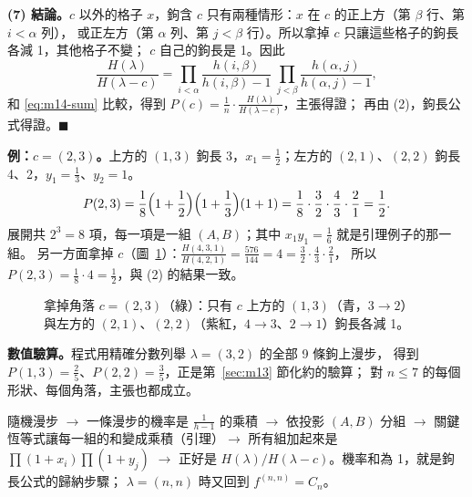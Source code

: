 \textbf{(7) 結論。}$c$ 以外的格子 $x$，鉤含 $c$ 只有兩種情形：$x$ 在 $c$ 的正上方（第 $\beta$ 行、第 $i<\alpha$ 列），
或正左方（第 $\alpha$ 列、第 $j<\beta$ 行）。所以拿掉 $c$ 只讓這些格子的鉤長各減 1，其他格子不變；
$c$ 自己的鉤長是 1。因此
\[
\frac{H(\lambda)}{H(\lambda-c)}=\prod_{i<\alpha}\frac{h(i,\beta)}{h(i,\beta)-1}\ \prod_{j<\beta}\frac{h(\alpha,j)}{h(\alpha,j)-1},
\]
和 \eqref{eq:m14-sum} 比較，得到 $P(c)=\frac1n\cdot\frac{H(\lambda)}{H(\lambda-c)}$，主張得證；
再由 (2)，鉤長公式得證。$\blacksquare$

\textbf{例：$c=(2,3)$。}上方的 $(1,3)$ 鉤長 3，$x_1=\frac12$；左方的 $(2,1)$、$(2,2)$ 鉤長 4、2，$y_1=\frac13$、$y_2=1$。
\[
P(2,3)=\frac18\Bigl(1+\frac12\Bigr)\Bigl(1+\frac13\Bigr)(1+1)=\frac18\cdot\frac32\cdot\frac43\cdot\frac21=\frac12 .
\]
展開共 $2^3=8$ 項，每一項是一組 $(A,B)$；其中 $x_1y_1=\frac16$ 就是引理例子的那一組。
另一方面拿掉 $c$（圖~\ref{fig:m14-remove}）：$\frac{H(4,3,1)}{H(4,2,1)}=\frac{576}{144}=4=\frac32\cdot\frac43\cdot\frac21$，
所以 $P(2,3)=\frac18\cdot4=\frac12$，與 (2) 的結果一致。

\begin{figure}[H]
\centering
\FigMXIVRemove
\caption{拿掉角落 $c=(2,3)$（\textcolor{cC}{綠}）：只有 $c$ 上方的 $(1,3)$（\textcolor{cLeft}{青}，$3\to2$）
與左方的 $(2,1)$、$(2,2)$（\textcolor{cRight}{紫紅}，$4\to3$、$2\to1$）鉤長各減 1。}
\label{fig:m14-remove}
\end{figure}

\textbf{數值驗算。}程式用精確分數列舉 $\lambda=(3,2)$ 的全部 9 條鉤上漫步，
得到 $P(1,3)=\frac25$、$P(2,2)=\frac35$，正是第~\ref{sec:m13} 節化約的驗算；
對 $n\le7$ 的每個形狀、每個角落，主張也都成立。

\begin{keybox}[證明的骨架]
隨機漫步 $\to$ 一條漫步的機率是 $\frac{1}{h-1}$ 的乘積 $\to$ 依投影 $(A,B)$ 分組
$\to$ 關鍵恆等式讓每一組的和變成乘積（引理）$\to$ 所有組加起來是 $\prod(1+x_i)\prod(1+y_j)$
$\to$ 正好是 $H(\lambda)/H(\lambda-c)$。機率和為 1，就是鉤長公式的歸納步驟；
$\lambda=(n,n)$ 時又回到 $f^{(n,n)}=C_n$。
\end{keybox}
